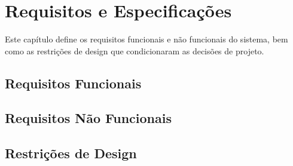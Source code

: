 

\chapter{Requisitos e Especificações}
\label{chapter:requirements}

\begin{introduction}
Este capítulo define os requisitos funcionais e não funcionais do sistema, bem como as restrições de design que condicionaram as decisões de projeto.
\end{introduction}



\section{Requisitos Funcionais}
\label{sec:requisitos-funcionais}


\section{Requisitos Não Funcionais}
\label{sec:requisitos-nao-funcionais}


\section{Restrições de Design}
\label{sec:restricoes-design}

